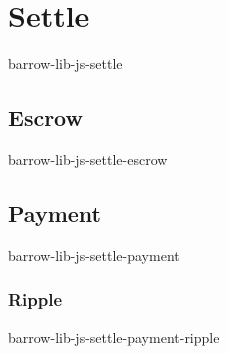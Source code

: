 \section{Settle}
barrow-lib-js-settle

\subsection{Escrow}
barrow-lib-js-settle-escrow

\subsection{Payment}
barrow-lib-js-settle-payment

\subsubsection{Ripple}
barrow-lib-js-settle-payment-ripple
